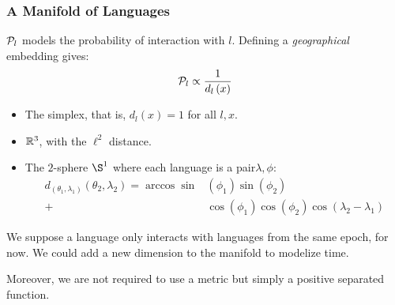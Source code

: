 \documentclass[ratio=169]{beamercours}
\begin{document}
\begin{frame}[allowframebreaks]
	\frametitle{A Manifold of Languages}
	$\mathcal{P}_{l}$ models the probability of interaction with $l$.
	Defining a \emph{geographical} embedding gives:
	\begin{equation*}
		\mathcal{P}_{l} \propto \frac{1}{d_{l}\left( x \right)}
	\end{equation*}

	\framebreak

	\begin{itemize}
		\item The simplex, that is, $d_{l}(x) = 1$ for all $l, x$.
		\item $\mathbb{R}^{3}$, with the $\ell^{2}$ distance.
		\item The $2$-sphere $\S^{1}$ where each language is a pair$\lambda, \phi$:
	      \begin{equation*}
			  \begin{aligned}
				  d_{\left( \theta_{1}, \lambda_{1} \right)}\left( \theta_{2}, \lambda_{2} \right) = \arccos \sin& \left(\phi_{1}\right) \sin\left( \phi_{2} \right)\\
				  +& \cos\left( \phi_{1} \right)\cos\left( \phi_{2} \right)\cos\left( \lambda_{2} - \lambda_{1} \right)
				  \end{aligned}
	      \end{equation*}
	\end{itemize}

	\framebreak

	We suppose a language only interacts with languages from the same epoch, for now.
	We could add a new dimension to the manifold to modelize time.

	Moreover, we are not required to use a metric but simply a positive separated function.

\end{frame}
\end{document}
